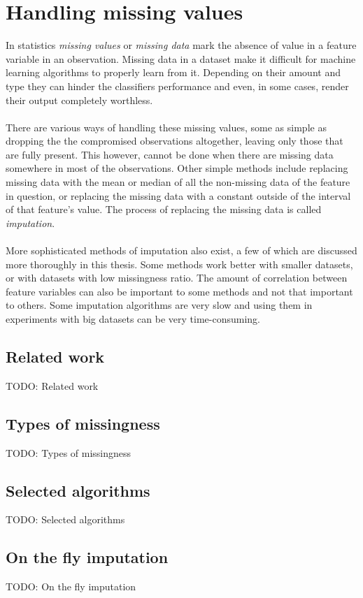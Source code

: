 \documentclass[11pt]{article}
\begin{document}
  \section{Handling missing values}
    In statistics {\it missing values} or {\it missing data} mark the absence of value in a feature variable in an observation. Missing data in a dataset make it difficult for machine learning algorithms to properly learn from it. Depending on their amount and type they can hinder the classifiers performance and even, in some cases, render their output completely worthless.
    \\~\\
    There are various ways of handling these missing values, some as simple as dropping the the compromised observations altogether, leaving only those that are fully present. This however, cannot be done when there are missing data somewhere in most of the observations. Other simple methods include replacing missing data with the mean or median of all the non-missing data of the feature in question, or replacing the missing data with a constant outside of the interval of that feature's value. The process of replacing the missing data is called {\it imputation}.
    \\~\\
    More sophisticated methods of imputation also exist, a few of which are discussed more thoroughly in this thesis. Some methods work better with smaller datasets, or with datasets with low missingness ratio. The amount of correlation between feature variables can also be important to some methods and not that important to others. Some imputation algorithms are very slow and using them in experiments with big datasets can be very time-consuming.
    \subsection{Related work}
      TODO: Related work
    \subsection{Types of missingness}
      TODO: Types of missingness
    \subsection{Selected algorithms}
      TODO: Selected algorithms
      \subsection{On the fly imputation}
        TODO: On the fly imputation
\end{document}
